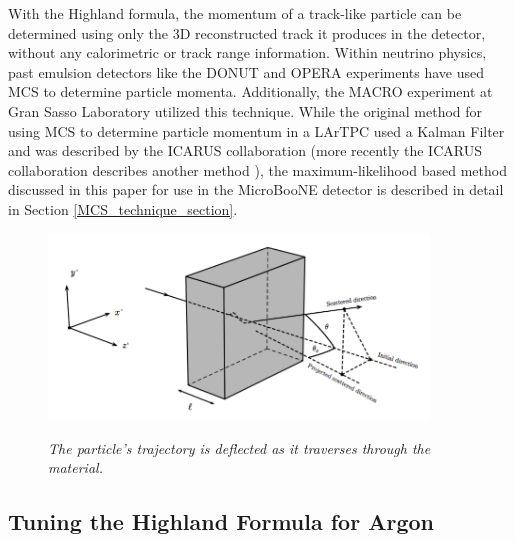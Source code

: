 \documentclass[a4paper,11pt]{article}
\begin{document}
With the Highland formula, the momentum of a track-like particle can be determined using only the 3D reconstructed track it produces in the detector, without any calorimetric or track range information. Within neutrino physics, past emulsion detectors like the DONUT \cite{DONUT_paper} and OPERA \cite{OPERA_paper} experiments have used MCS to determine particle momenta. Additionally, the MACRO \cite{MACRO_paper} experiment at Gran Sasso Laboratory utilized this technique. While the original method for using MCS to determine particle momentum in a LArTPC used a Kalman Filter and was described by the ICARUS collaboration \cite{icarus_mcs_paper} (more recently the ICARUS collaboration describes another method \cite{new_icarus_paper}), the maximum-likelihood based method discussed in this paper for use in the MicroBooNE detector is described in detail in Section \ref{MCS_technique_section}.


\begin{figure}[ht!]
\centering
	\includegraphics[width=0.9\textwidth]{Figures/static_figs/mcs_nocap.png} \\
\caption{\textit{The particle's trajectory is deflected as it traverses through the material.}}\label{mcs_nocap_fig}
\end{figure}












\subsection{Tuning the Highland Formula for Argon}\label{highland_tuning_section}
\end{document}
